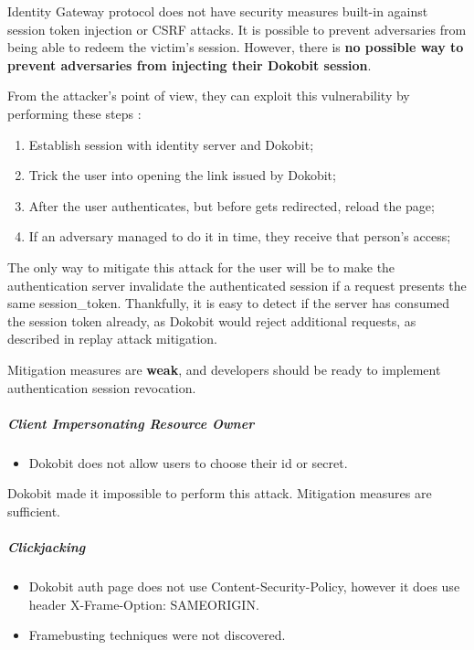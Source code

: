 Identity Gateway protocol does not have security measures built-in against session token injection or CSRF attacks. It is possible to prevent adversaries from being able to redeem the victim's session. However, there is \textbf{no possible way to prevent adversaries from injecting their Dokobit session}.

From the attacker's point of view, they can exploit this vulnerability by performing these steps \cite{video-exploitdokobit}:

\begin{enumerate}
  \item Establish session with identity server and Dokobit;
  \item Trick the user into opening the link issued by Dokobit;
  \item After the user authenticates, but before gets redirected, reload the page;
  \item If an adversary managed to do it in time, they receive that person's access;
\end{enumerate}

The only way to mitigate this attack for the user will be to make the authentication server invalidate the authenticated session if a request presents the same session\_token. Thankfully, it is easy to detect if the server has consumed the session token already, as Dokobit would reject additional requests, as described in replay attack mitigation.

Mitigation measures are \textbf{weak}, and developers should be ready to implement authentication session revocation.

\subparagraph{Client Impersonating Resource Owner}

\begin{itemize}
  \item Dokobit does not allow users to choose their id or secret.
\end{itemize}

Dokobit made it impossible to perform this attack. Mitigation measures are sufficient.

\subparagraph{Clickjacking}

\begin{itemize}
  \item Dokobit auth page does not use Content-Security-Policy, however it does use header X-Frame-Option: {SAMEORIGIN}.
  \item Framebusting \cite{RYDSTEDT2010BUSTI} techniques were not discovered.
\end{itemize}

